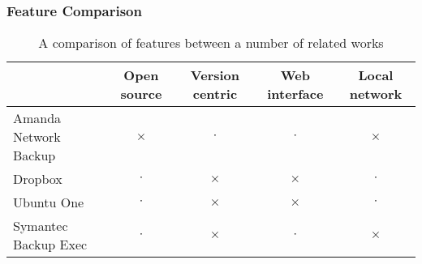 \subsubsection{Feature Comparison}

\begin{table}[H]
    \centering
    \begin{tabular}{ | l | c | c | c | c | }
        \hline
        & Open source   & Version centric   & Web interface & Local network
            \\ \hline

        Amanda Network Backup   & $\times$  & $\cdot$   & $\cdot$   & $\times$
            \\ \hline

        Dropbox                 & $\cdot$   & $\times$  & $\times$  & $\cdot$
            \\ \hline

        Ubuntu One              & $\cdot$   & $\times$  & $\times$  & $\cdot$
            \\ \hline

        Symantec Backup Exec    & $\cdot$   & $\times$  & $\cdot$   & $\times$
            \\ \hline
    \end{tabular}
    \caption{A comparison of features between a number of related works}
    \label{tab:feature-comparison}
\end{table}
